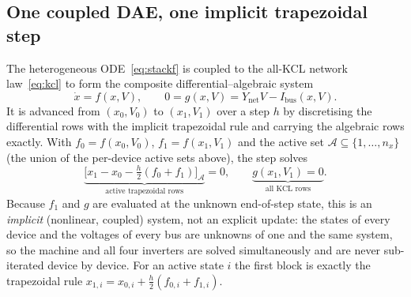 \documentclass[12pt,a4paper]{article}
\begin{document}
\subsection{One coupled DAE, one implicit trapezoidal step}\label{sec:ts-couple}
The heterogeneous ODE~\eqref{eq:stackf} is coupled to the all-KCL network
law~\eqref{eq:kcl} to form the composite differential--algebraic system
\begin{equation}
  \dot x = f(x,V),\qquad 0 = g(x,V)=Y_{\mathrm{net}}V-I_{\mathrm{bus}}(x,V).
  \label{eq:dae}
\end{equation}
It is advanced from $(x_0,V_0)$ to $(x_1,V_1)$ over a step $h$ by discretising
the differential rows with the implicit trapezoidal rule and carrying the
algebraic rows exactly. With $f_0=f(x_0,V_0)$, $f_1=f(x_1,V_1)$ and the active
set $\mathcal{A}\subseteq\{1,\dots,n_x\}$ (the union of the per-device active
sets above), the step solves
\begin{equation}
  \underbrace{\bigl[x_1-x_0-\tfrac{h}{2}(f_0+f_1)\bigr]_{\mathcal{A}}}
     _{\text{active trapezoidal rows}}=0,
  \qquad
  \underbrace{g(x_1,V_1)=0}_{\text{all KCL rows}}.
  \label{eq:trap}
\end{equation}
Because $f_1$ and $g$ are evaluated at the unknown end-of-step state, this is an
\emph{implicit} (nonlinear, coupled) system, not an explicit update: the states
of every device and the voltages of every bus are unknowns of one and the same
system, so the machine and all four inverters are solved simultaneously and are
never sub-iterated device by device. For an active state $i$ the first block is
exactly the trapezoidal rule
$x_{1,i}=x_{0,i}+\tfrac{h}{2}(f_{0,i}+f_{1,i})$.
\end{document}
